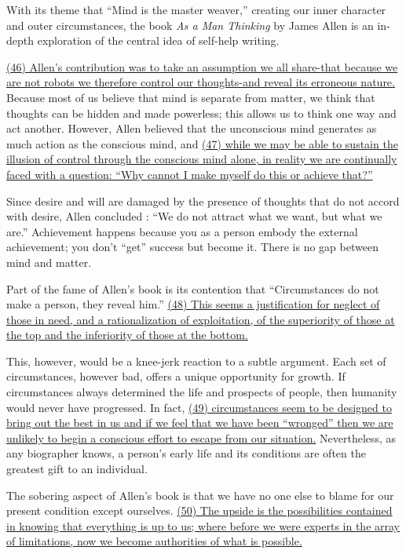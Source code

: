 
\qquad With its theme that ``Mind is the master weaver,'' creating our inner character and outer circumstances, the book \emph{As a Man Thinking} by James Allen is an in-depth exploration of the central idea of self-help writing.

\qquad \ul{(46) Allen's contribution was to take an assumption we all share-that because we are not robots we therefore control our thoughts-and reveal its erroneous nature.} Because most of us believe that mind is separate from matter, we think that thoughts can be hidden and made powerless; this allows us to think one way and act another. However, Allen believed that the unconscious mind generates as much action as the conscious mind, and \ul{(47) while we may be able to sustain the illusion of control through the conscious mind alone, in reality we are continually faced with a question: ``Why cannot I make myself do this or achieve that?''}

\qquad Since desire and will are damaged by the presence of thoughts that do not accord with desire, Allen concluded : ``We do not attract what we want, but what we are.'' Achievement happens because you as a person embody the external achievement; you don't ``get'' success but become it. There is no gap between mind and matter.

\qquad Part of the fame of Allen's book is its contention that ``Circumstances do not make a person, they reveal him.'' \ul{(48) This seems a justification for neglect of those in need, and a rationalization of exploitation, of the superiority of those at the top and the inferiority of those at the bottom.}

\qquad This, however, would be a knee-jerk reaction to a subtle argument. Each set of circumstances, however bad, offers a unique opportunity for growth. If circumstances always determined the life and prospects of people, then humanity would never have progressed. In fact, \ul{(49) circumstances seem to be designed to bring out the best in us and if we feel that we have been ``wronged'' then we are unlikely to begin a conscious effort to escape from our situation.} Nevertheless, as any biographer knows, a person's early life and its conditions are often the greatest gift to an individual.

\qquad The sobering aspect of Allen's book is that we have no one else to blame for our present condition except ourselves. \ul{(50) The upside is the possibilities contained in knowing that everything is up to us; where before we were experts in the array of limitations, now we become authorities of what is possible.}
